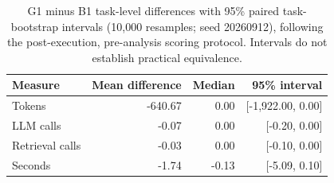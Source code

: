 \begin{table}[!ht]
\centering
\small
\caption[Paired G1 minus B1 resource and latency differences]{G1 minus B1 task-level differences with 95\% paired task-bootstrap intervals (10,000 resamples; seed 20260912), following the post-execution, pre-analysis scoring protocol. Intervals do not establish practical equivalence.}
\label{tab:paired-execution}
\begin{tabular}{lrrr}
\toprule
Measure & Mean difference & Median & 95\% interval \\
\midrule
Tokens & -640.67 & 0.00 & [-1,922.00, 0.00] \\
LLM calls & -0.07 & 0.00 & [-0.20, 0.00] \\
Retrieval calls & -0.03 & 0.00 & [-0.10, 0.00] \\
Seconds & -1.74 & -0.13 & [-5.09, 0.10] \\
\bottomrule
\end{tabular}
\end{table}
